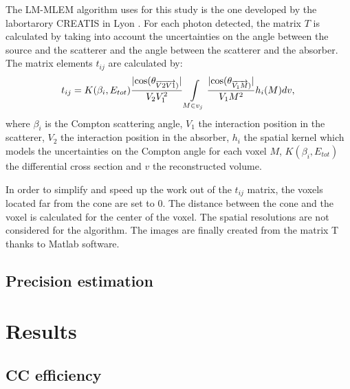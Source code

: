 \documentclass[12pt]{iopart}
\begin{document}
The LM-MLEM algorithm uses for this study is the one developed by the labortarory CREATIS in Lyon \cite{maxim_analytical_2009,lojacono_low_2013,maxim_filtered_2014,hilaire_compton_2014}.\newline
For each photon detected, the matrix $T$ is calculated by taking into account the uncertainties on the angle between the source and the scatterer and the angle between the scatterer and the absorber.
The matrix elements  $t_{ij}$  are calculated by:
\begin{equation}
 t_{ij} = K(\beta_i,E_{tot})\frac{|\rm{cos}(\theta_{\overrightarrow{V2V1})} |}{V_2V_1^2} \int\limits_{M\in v_j} \frac{|\rm{cos}(\theta_{\overrightarrow{V_1M})}| }{V_1M^2} h_i(M)dv,
 \label{eq:equation_tij_compton_med_nucleaire}\newline
\end{equation}
where $\beta_i$ is the Compton scattering angle, $V_1$ the interaction position in the scatterer, $V_2$ the interaction position in the absorber, $h_i$ the spatial kernel which models the uncertainties on the Compton angle for each voxel $M$, $K(\beta_i,E_{tot})$ the differential cross section and $v$ the reconstructed volume.\newline

In order to simplify and speed up the work out of the $t_{ij}$ matrix, the voxels located far from the cone are set to 0. The distance between the cone and the voxel is calculated for the center of the voxel. The spatial resolutions are not considered for the algorithm.\newline
The images are finally created from the matrix T thanks to Matlab software.

\subsection{Precision estimation\newline}


	
\newpage
	

\section{Results}

\subsection{CC efficiency\newline}
\end{document}
